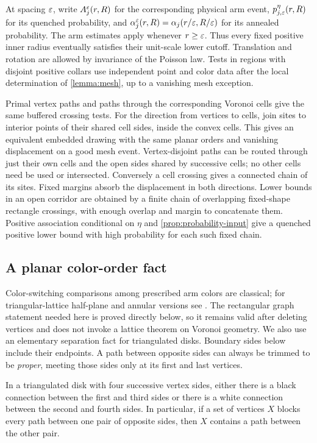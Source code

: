 At spacing $\varepsilon$, write $A_j^\varepsilon(r,R)$ for the corresponding physical
arm event, $p_{j,\varepsilon}^\eta(r,R)$ for its quenched probability, and
$\alpha_j^\varepsilon(r,R)=\alpha_j(r/\varepsilon,R/\varepsilon)$ for its annealed probability.
The arm estimates apply whenever $r\ge\varepsilon$.  Thus every fixed positive
inner radius eventually satisfies their unit-scale lower cutoff.
Translation and rotation are allowed by
invariance of the Poisson law.  Tests in regions with disjoint positive
collars use independent point and color data after the local determination
of \cref{lemma:mesh}, up to a vanishing mesh exception.

Primal vertex paths and paths through the corresponding Voronoi cells
give the same buffered crossing tests.  For the direction from vertices
to cells, join sites to interior points of their shared cell sides, inside
the convex cells.  This gives an equivalent embedded drawing with the
same planar orders and vanishing displacement on a good mesh event.
Vertex-disjoint paths can be routed through just their own cells and the
open sides shared by successive cells; no other cells need be used or
intersected.  Conversely a cell crossing gives a connected chain of its
sites.  Fixed margins absorb the displacement in both directions.
Lower bounds in an open corridor are obtained by a finite chain of
overlapping fixed-shape rectangle crossings, with enough overlap and
margin to concatenate them.  Positive association conditional on $\eta$
and \cref{prop:probability-input} give a quenched positive lower bound
with high probability for each such fixed chain.

\subsection{A planar color-order fact}

Color-switching comparisons among prescribed arm colors are classical;
for triangular-lattice half-plane and annular versions see
\cite[Propositions~19--20]{Nolin2008}. The rectangular graph statement
needed here is proved directly below, so it remains valid after deleting
vertices and does not invoke a lattice theorem on Voronoi geometry.
We also use an elementary separation fact for triangulated disks.
Boundary sides below include their endpoints.  A path between opposite sides can always be
trimmed to be \emph{proper}, meeting those sides only at its first and
last vertices.

\begin{lemma}\label{prob:hex}
In a triangulated disk with four successive vertex sides, either there is
a black connection between the first and third sides or there is a white
connection between the second and fourth sides.  In particular, if a set
of vertices $X$ blocks every path between one pair of opposite sides,
then $X$ contains a path between the other pair.
\end{lemma}

